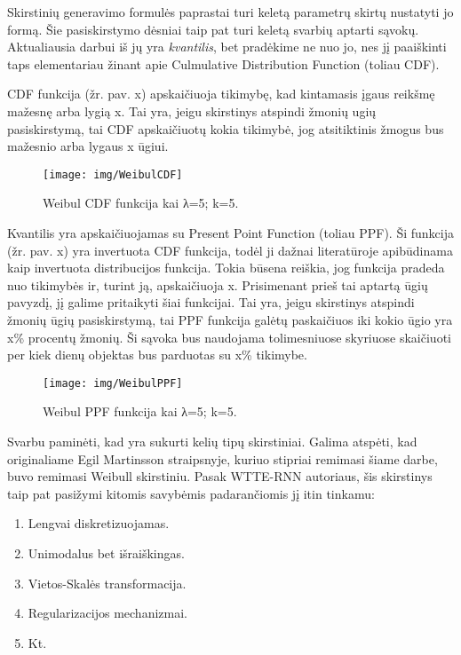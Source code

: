 \documentclass{VUMIFPSkursinis}
\begin{document}
Skirstinių generavimo formulės paprastai turi keletą parametrų skirtų nustatyti jo formą. Šie pasiskirstymo dėsniai taip pat turi keletą svarbių aptarti sąvokų. Aktualiausia darbui iš jų yra \textit{kvantilis}, bet pradėkime ne nuo jo, nes jį paaiškinti taps elementariau žinant apie Culmulative Distribution Function (toliau CDF). 

CDF funkcija (žr. pav. x) apskaičiuoja tikimybę, kad kintamasis įgaus reikšmę mažesnę arba lygią x. Tai yra, jeigu skirstinys atspindi žmonių ugių pasiskirstymą, tai CDF apskaičiuotų kokia tikimybė, jog atsitiktinis žmogus bus mažesnio arba lygaus x ūgiui. 

\begin{figure}[H]
  \centering
  \texttt{[image: img/WeibulCDF]}
  \caption{ Weibul CDF funkcija kai λ=5; k=5.}
  \label{img:WeibulCDF}
\end{figure}

Kvantilis yra apskaičiuojamas su Present Point Function (toliau PPF). Ši funkcija (žr. pav. x) yra invertuota CDF funkcija, todėl ji dažnai literatūroje apibūdinama kaip invertuota distribucijos funkcija. Tokia būsena reiškia, jog funkcija pradeda nuo tikimybės ir, turint ją, apskaičiuoja x. Prisimenant prieš tai aptartą ūgių pavyzdį, jį galime pritaikyti šiai funkcijai. Tai yra, jeigu skirstinys atspindi žmonių ūgių pasiskirstymą, tai PPF funkcija galėtų paskaičiuos iki kokio ūgio yra x\% procentų žmonių. Ši sąvoka bus naudojama tolimesniuose skyriuose skaičiuoti per kiek dienų objektas bus parduotas su x\% tikimybe.


\begin{figure}[H]
  \centering
  \texttt{[image: img/WeibulPPF]}
  \caption{  Weibul PPF funkcija kai λ=5; k=5.}
  \label{img:WeibulPPF}
\end{figure}

Svarbu paminėti, kad yra sukurti kelių tipų skirstiniai. Galima atspėti, kad originaliame Egil Martinsson straipsnyje, kuriuo stipriai remimasi šiame darbe, buvo remimasi Weibull skirstiniu. Pasak WTTE-RNN autoriaus, šis skirstinys taip pat pasižymi kitomis savybėmis padarančiomis jį itin tinkamu:

\begin{enumerate}
  \item Lengvai diskretizuojamas.
  \item Unimodalus bet išraiškingas.
  \item Vietos-Skalės transformacija.
  \item Regularizacijos mechanizmai.
  \item Kt.
\end{enumerate}
\end{document}
